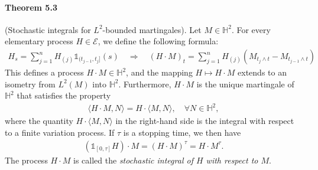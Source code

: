\documentclass{article}
\numberwithin{equation}{section}
\theoremstyle{plain}
\theoremstyle{definition}
\begin{document}
\paragraph{Theorem 5.3\label{thm:5.3}} (Stochastic integrals for $L^2$-bounded martingales). Let $M\in\mathbb{H}^2$. For every elementary process $H\in\mathscr{E}$, we define the following formula:
\begin{align*}
	H_s=\sum_{j=1}^nH_{(j)}\mathds{1}_{(t_{j-1},t_j]}(s)\quad\Rightarrow\quad
	(H\cdot M)_t = \sum_{j=1}^n H_{(j)}\left(M_{t_j\wedge t} - M_{t_{j-1}\wedge t}\right)
\end{align*}
This defines a process $H\cdot M\in\mathbb{H}^2$, and the mapping $H\mapsto H\cdot M$ extends to an isometry from $L^2(M)$ into $\mathbb{H}^2$. Furthermore, $H\cdot M$ is the unique martingale of $\mathbb{H}^2$ that satisfies the property
\begin{align*}
	\langle H\cdot M,N\rangle = H\cdot\langle M,N\rangle,\quad \forall N\in\mathbb{H}^2,\tag{5.1}\label{eq:5.1}
\end{align*}
where the quantity $H\cdot\langle M,N\rangle$ in the right-hand side is the integral with respect to a finite variation process. If $\tau$ is a stopping time, we then have
\begin{align*}
	(\mathds{1}_{[0,\tau]}H)\cdot M = (H\cdot M)^\tau = H\cdot M^\tau.\tag{5.2}\label{eq:5.2}
\end{align*}
The process $H\cdot M$ is called the \textit{stochastic integral of $H$ with respect to $M$}.
\end{document}
